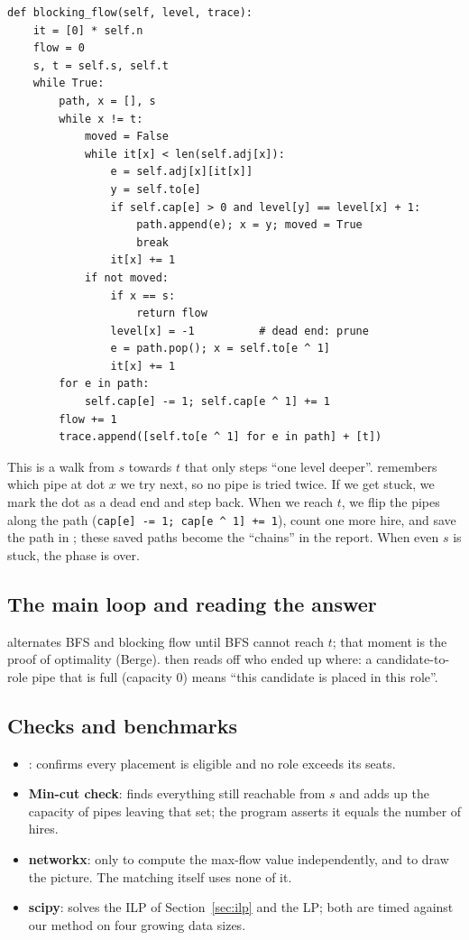 \documentclass[11pt]{article}
\begin{document}
\begin{lstlisting}
def blocking_flow(self, level, trace):
    it = [0] * self.n
    flow = 0
    s, t = self.s, self.t
    while True:
        path, x = [], s
        while x != t:
            moved = False
            while it[x] < len(self.adj[x]):
                e = self.adj[x][it[x]]
                y = self.to[e]
                if self.cap[e] > 0 and level[y] == level[x] + 1:
                    path.append(e); x = y; moved = True
                    break
                it[x] += 1
            if not moved:
                if x == s:
                    return flow
                level[x] = -1          # dead end: prune
                e = path.pop(); x = self.to[e ^ 1]
                it[x] += 1
        for e in path:
            self.cap[e] -= 1; self.cap[e ^ 1] += 1
        flow += 1
        trace.append([self.to[e ^ 1] for e in path] + [t])
\end{lstlisting}
This is a walk from $s$ towards $t$ that only steps ``one level deeper''.  remembers which pipe at dot $x$ we try next, so no pipe is tried twice. If we get stuck, we mark the dot as a dead end and step back. When we reach $t$, we flip the pipes along the path (\verb|cap[e] -= 1; cap[e ^ 1] += 1|), count one more hire, and save the path in ; these saved paths become the ``chains'' in the report. When even $s$ is stuck, the phase is over.

\subsection{The main loop and reading the answer}

 alternates BFS and blocking flow until BFS cannot reach $t$; that moment is the proof of optimality (Berge).  then reads off who ended up where: a candidate-to-role pipe that is full (capacity 0) means ``this candidate is placed in this role''.

\subsection{Checks and benchmarks}

\begin{itemize}
 \item {}: confirms every placement is eligible and no role exceeds its seats.
 \item \textbf{Min-cut check}: finds everything still reachable from $s$ and adds up the capacity of pipes leaving that set; the program asserts it equals the number of hires.
 \item \textbf{networkx}: only to compute the max-flow value independently, and to draw the picture. The matching itself uses none of it.
 \item \textbf{scipy}:  solves the ILP of Section~\ref{sec:ilp} and  the LP; both are timed against our method on four growing data sizes.
\end{itemize}
\end{document}
